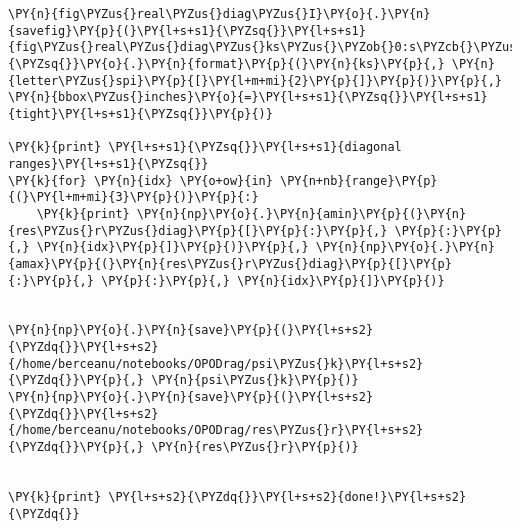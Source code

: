 \begin{Verbatim}[commandchars=\\\{\}]
\PY{n}{fig\PYZus{}real\PYZus{}diag\PYZus{}I}\PY{o}{.}\PY{n}{savefig}\PY{p}{(}\PY{l+s+s1}{\PYZsq{}}\PY{l+s+s1}{fig\PYZus{}real\PYZus{}diag\PYZus{}ks\PYZus{}\PYZob{}0:s\PYZcb{}\PYZus{}\PYZob{}1:s\PYZcb{}}\PY{l+s+s1}{\PYZsq{}}\PY{o}{.}\PY{n}{format}\PY{p}{(}\PY{n}{ks}\PY{p}{,} \PY{n}{letter\PYZus{}spi}\PY{p}{[}\PY{l+m+mi}{2}\PY{p}{]}\PY{p}{)}\PY{p}{,} \PY{n}{bbox\PYZus{}inches}\PY{o}{=}\PY{l+s+s1}{\PYZsq{}}\PY{l+s+s1}{tight}\PY{l+s+s1}{\PYZsq{}}\PY{p}{)}

\PY{k}{print} \PY{l+s+s1}{\PYZsq{}}\PY{l+s+s1}{diagonal ranges}\PY{l+s+s1}{\PYZsq{}}
\PY{k}{for} \PY{n}{idx} \PY{o+ow}{in} \PY{n+nb}{range}\PY{p}{(}\PY{l+m+mi}{3}\PY{p}{)}\PY{p}{:}
    \PY{k}{print} \PY{n}{np}\PY{o}{.}\PY{n}{amin}\PY{p}{(}\PY{n}{res\PYZus{}r\PYZus{}diag}\PY{p}{[}\PY{p}{:}\PY{p}{,} \PY{p}{:}\PY{p}{,} \PY{n}{idx}\PY{p}{]}\PY{p}{)}\PY{p}{,} \PY{n}{np}\PY{o}{.}\PY{n}{amax}\PY{p}{(}\PY{n}{res\PYZus{}r\PYZus{}diag}\PY{p}{[}\PY{p}{:}\PY{p}{,} \PY{p}{:}\PY{p}{,} \PY{n}{idx}\PY{p}{]}\PY{p}{)}


\PY{n}{np}\PY{o}{.}\PY{n}{save}\PY{p}{(}\PY{l+s+s2}{\PYZdq{}}\PY{l+s+s2}{/home/berceanu/notebooks/OPODrag/psi\PYZus{}k}\PY{l+s+s2}{\PYZdq{}}\PY{p}{,} \PY{n}{psi\PYZus{}k}\PY{p}{)}
\PY{n}{np}\PY{o}{.}\PY{n}{save}\PY{p}{(}\PY{l+s+s2}{\PYZdq{}}\PY{l+s+s2}{/home/berceanu/notebooks/OPODrag/res\PYZus{}r}\PY{l+s+s2}{\PYZdq{}}\PY{p}{,} \PY{n}{res\PYZus{}r}\PY{p}{)}


\PY{k}{print} \PY{l+s+s2}{\PYZdq{}}\PY{l+s+s2}{done!}\PY{l+s+s2}{\PYZdq{}}
\end{Verbatim}


